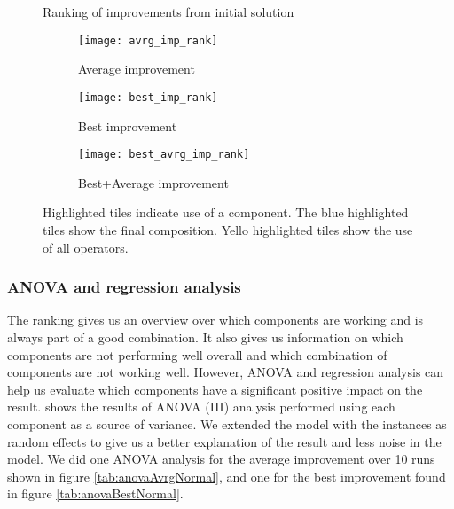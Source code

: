 \documentclass[../main.tex]{subfiles}
\begin{document}
\begin{figure}
    \centering
    \caption{Ranking of improvements from initial solution}
    \begin{subfigure}[b]{0.95\textwidth}
        \centering
        \texttt{[image: avrg\_imp\_rank]}
        \caption{Average improvement}
        \label{fig:avrgRank}
    \end{subfigure}

    \begin{subfigure}[b]{0.95\textwidth}
        \centering
        \texttt{[image: best\_imp\_rank]}
        \caption{Best improvement}
        \label{fig:bestRank}
    \end{subfigure}

    \begin{subfigure}[b]{0.95\textwidth}
        \centering
        \texttt{[image: best\_avrg\_imp\_rank]}
        \caption{Best+Average improvement}
        \label{fig:avrgBestRank}
    \end{subfigure}
    \label{fig:rank}
    \caption*{Highlighted tiles indicate use of a component. The blue highlighted tiles show the final composition. Yello highlighted tiles show the use of all operators.}
\end{figure}



\subsubsection{ANOVA and regression analysis}
The ranking gives us an overview over which components are working and is always part of a good combination.
It also gives us information on which components are not performing well overall and which combination of components are not working well.
However, ANOVA and regression analysis can help us evaluate which components have a significant positive impact on the result.
 shows the results of ANOVA (III) analysis performed using each component as a source of variance. 
We extended the model with the instances as random effects to give us a better explanation of the result and less noise in the model. 
We did one ANOVA analysis for the average improvement over 10 runs shown in figure \ref{tab:anovaAvrgNormal}, and one for the best improvement found in figure \ref{tab:anovaBestNormal}. \par
\end{document}
